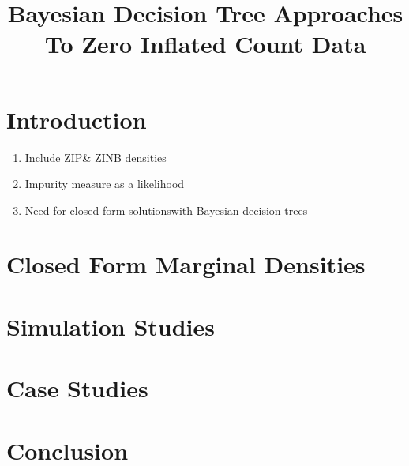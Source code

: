 \documentclass{article}
\newcommand{\CFS}{closed form solutions}
\begin{document}
\title{Bayesian Decision Tree Approaches To Zero Inflated Count Data}
\maketitle

\section{Introduction}

\begin{enumerate}
\item Include ZIP\& ZINB densities 
\item Impurity measure as a likelihood 
\item Need for \CFS with Bayesian decision trees
\end{enumerate}

\section{Closed Form Marginal Densities}

\section{Simulation Studies}

\section{Case Studies}

\section{Conclusion}
\end{document}
